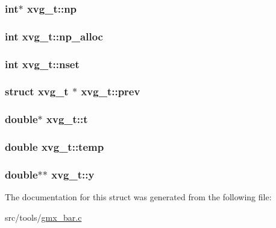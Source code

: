 \hypertarget{structxvg__t_a0cbc9726322f54abc9cea297acc43efa}{
\subsubsection[{np}]{\setlength{\rightskip}{0pt plus 5cm}int$\ast$ {\bf xvg\-\_\-t\-::np}}}\label{structxvg__t_a0cbc9726322f54abc9cea297acc43efa}
\hypertarget{structxvg__t_a6ee40990ccea9dc7370a1c09224ea30a}{
\subsubsection[{np\-\_\-alloc}]{\setlength{\rightskip}{0pt plus 5cm}int {\bf xvg\-\_\-t\-::np\-\_\-alloc}}}\label{structxvg__t_a6ee40990ccea9dc7370a1c09224ea30a}
\hypertarget{structxvg__t_af132b3021b420dfcebc60bdb502e3737}{
\subsubsection[{nset}]{\setlength{\rightskip}{0pt plus 5cm}int {\bf xvg\-\_\-t\-::nset}}}\label{structxvg__t_af132b3021b420dfcebc60bdb502e3737}
\hypertarget{structxvg__t_a623a489131cbd2ccc564e41e02f38c8b}{
\subsubsection[{prev}]{\setlength{\rightskip}{0pt plus 5cm}struct {\bf xvg\-\_\-t} $\ast$ {\bf xvg\-\_\-t\-::prev}}}\label{structxvg__t_a623a489131cbd2ccc564e41e02f38c8b}
\hypertarget{structxvg__t_a2f078d656caf07ca696acdc45916701c}{
\subsubsection[{t}]{\setlength{\rightskip}{0pt plus 5cm}double$\ast$ {\bf xvg\-\_\-t\-::t}}}\label{structxvg__t_a2f078d656caf07ca696acdc45916701c}
\hypertarget{structxvg__t_aec77804712e4d36bb8ee445b62ef3d0c}{
\subsubsection[{temp}]{\setlength{\rightskip}{0pt plus 5cm}double {\bf xvg\-\_\-t\-::temp}}}\label{structxvg__t_aec77804712e4d36bb8ee445b62ef3d0c}
\hypertarget{structxvg__t_a309dc45889430b32beb7eb1e8f9882f6}{
\subsubsection[{y}]{\setlength{\rightskip}{0pt plus 5cm}double$\ast$$\ast$ {\bf xvg\-\_\-t\-::y}}}\label{structxvg__t_a309dc45889430b32beb7eb1e8f9882f6}


\-The documentation for this struct was generated from the following file\-:\begin{DoxyCompactItemize}
\item 
src/tools/\hyperlink{gmx__bar_8c}{gmx\-\_\-bar.\-c}\end{DoxyCompactItemize}
